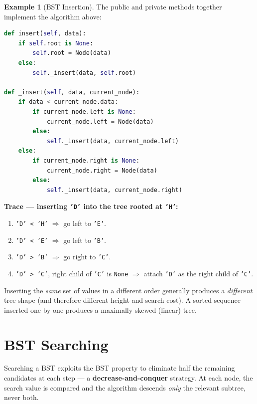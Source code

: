 \documentclass[11pt, a4paper, notitlepage]{report}
\theoremstyle{definition}
\theoremstyle{remark}
\theoremstyle{definition}
\newtheorem{example}[theorem]{Example}
\begin{document}
\begin{example}[BST Insertion]
\label{ex:bst-insert}
The public and private methods together implement the algorithm above:

\begin{lstlisting}[language=Python]
def insert(self, data):
    if self.root is None:
        self.root = Node(data)
    else:
        self._insert(data, self.root)

def _insert(self, data, current_node):
    if data < current_node.data:
        if current_node.left is None:
            current_node.left = Node(data)
        else:
            self._insert(data, current_node.left)
    else:
        if current_node.right is None:
            current_node.right = Node(data)
        else:
            self._insert(data, current_node.right)
\end{lstlisting}

\textbf{Trace --- inserting \texttt{'D'} into the tree rooted at \texttt{'H'}:}
\begin{enumerate}
  \item \texttt{'D' < 'H'} $\Rightarrow$ go left to \texttt{'E'}.
  \item \texttt{'D' < 'E'} $\Rightarrow$ go left to \texttt{'B'}.
  \item \texttt{'D' > 'B'} $\Rightarrow$ go right to \texttt{'C'}.
  \item \texttt{'D' > 'C'}, right child of \texttt{'C'} is \texttt{None}
        $\Rightarrow$ attach \texttt{'D'} as the right child of \texttt{'C'}.
\end{enumerate}
\end{example}

\begin{examtip}[title={Exam Tip: Insertion Order Determines Tree Shape}]
Inserting the \emph{same} set of values in a different order generally produces a
\emph{different} tree shape (and therefore different height and search cost).  A sorted
sequence inserted one by one produces a maximally skewed (linear) tree.
\end{examtip}

\section{BST Searching}
\label{sec:bst-search}

Searching a BST exploits the BST property to eliminate half the remaining candidates at each
step --- a \textbf{decrease-and-conquer} strategy.  At each node, the search value is compared
and the algorithm descends \emph{only} the relevant subtree, never both.
\end{document}
